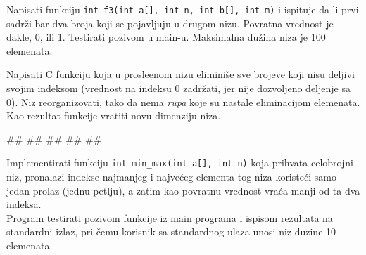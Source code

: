 \begin{Exercise}[label=p2.1_] 
Napisati funkciju \verb|int f3(int a[], int n, int b[], int m)| i
ispituje da li prvi sadr\v{z}i bar dva broja koji se pojavljuju u
drugom nizu. Povratna vrednost je dakle, 0, ili 1.  Testirati pozivom
u main-u. Maksimalna du\v zina niza je 100 elemenata.
\end{Exercise}
\begin{Answer}[ref=p2.1_]
\end{Answer}

\begin{Exercise}[label=p2.1_] 
Napisati C funkciju koja u prosle\d enom nizu elimini\v se sve brojeve
koji nisu deljivi svojim indeksom (vrednost na indeksu 0 zadr\v zati,
jer nije dozvoljeno deljenje sa 0). Niz reorganizovati, tako da nema
\emph{rupa} koje su nastale eliminacijom elemenata. Kao rezultat
funkcije vratiti novu dimenziju niza.
\begin{miditest}
\begin{upotreba}{1}
#\naslovInt#
##
##
##
##
\end{upotreba}
\end{miditest}
\end{Exercise}
\begin{Answer}[ref=p2.1_]
\end{Answer}

\begin{Exercise}[label=p2.1_] 
Implementirati funkciju \verb|int min_max(int a[], int n)| koja
prihvata celobrojni niz, pronalazi indekse najmanjeg i najve\' ceg
elementa tog niza koriste\' ci samo jedan prolaz (jednu petlju), a
zatim kao povratnu vrednost vra\' ca manji od ta dva
indeksa.\\ Program testirati pozivom funkcije iz main programa i
ispisom rezultata na standardni izlaz, pri \v cemu korisnik sa
standardnog ulaza unosi niz duzine 10 elemenata.
\end{Exercise}
\begin{Answer}[ref=p2.1_]
\end{Answer}

